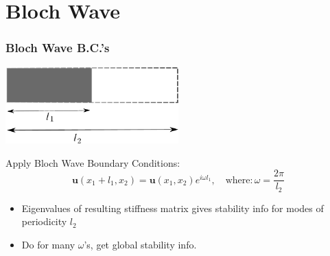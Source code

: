 \documentclass{beamer}
\begin{document}
\section{Bloch Wave}

\begin{frame}

	\frametitle{Bloch Wave B.C.'s}
	\begin{center}
	\includegraphics[width = 0.5\textwidth]{myFigures/blochDiagram}
	\end{center}
	Apply Bloch Wave Boundary Conditions: 
	\begin{equation*}
		\mathbf{u}(x_1 + l_1, x_2) = \mathbf{u}(x_1, x_2) e^{i \omega l_1}, \quad \text{where}: \omega = \frac{2 \pi}{l_2}
	\end{equation*}
	\begin{itemize}
		\item 	Eigenvalues of resulting stiffness matrix gives stability info for modes of periodicity $l_2$
		\item Do for many $\omega$'s, get global stability info.	
	\end{itemize}
	
\end{frame}
\end{document}

